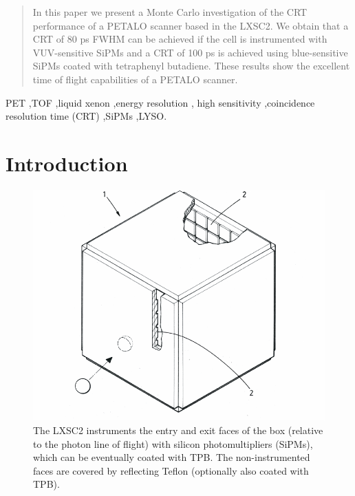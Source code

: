 \documentclass[review]{elsarticle}
\begin{document}
\begin{frontmatter}
\begin{abstract}
In this paper we present a Monte Carlo investigation of the CRT performance of a
PETALO scanner based in the LXSC2. We obtain that a CRT of 80 ps FWHM can be achieved if the cell is instrumented with VUV-sensitive SiPMs and a CRT of 100 ps is achieved using blue-sensitive SiPMs coated with tetraphenyl butadiene. These results show the excellent time of flight capabilities of a PETALO scanner.   
 \end{abstract}

\begin{keyword}
PET \sep TOF \sep liquid xenon \sep energy resolution \sep
 high sensitivity \sep coincidence resolution time (CRT) \sep SiPMs \sep LYSO.
\end{keyword}

\end{frontmatter}



\section{Introduction}

\begin{figure}[!htbp]
	\centering
	\includegraphics[scale=0.6]{../img/LXSC2.pdf}
	\caption{The LXSC2 instruments the entry and exit faces of the box (relative to the photon line of flight) with silicon photomultipliers (SiPMs), which can be eventually coated with TPB. The non-instrumented faces are covered by reflecting Teflon (optionally also coated with TPB).}\label{fig.box} 
\end{figure}
\end{document}
